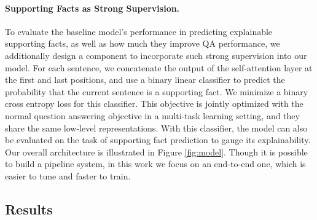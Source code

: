 \paragraph{Supporting Facts as Strong Supervision.}
To evaluate the baseline model's performance in predicting explainable supporting facts, as well as how much they improve QA performance, we additionally design a component to incorporate such strong supervision into our model.
For each sentence, we concatenate the output of the self-attention layer at the first and last positions, and use a binary linear classifier to predict the probability that the current sentence is a supporting fact.
We minimize a binary cross entropy loss for this classifier.
This objective is jointly optimized with the normal question answering objective in a multi-task learning setting, and they share the same low-level representations.
With this classifier, the model can also be evaluated on the task of supporting fact prediction to gauge its explainability.
Our overall architecture is illustrated in Figure \ref{fig:model}.
Though it is possible to build a pipeline system, in this work we focus on an end-to-end one, which is easier to tune and faster to train.






\subsection{Results}


